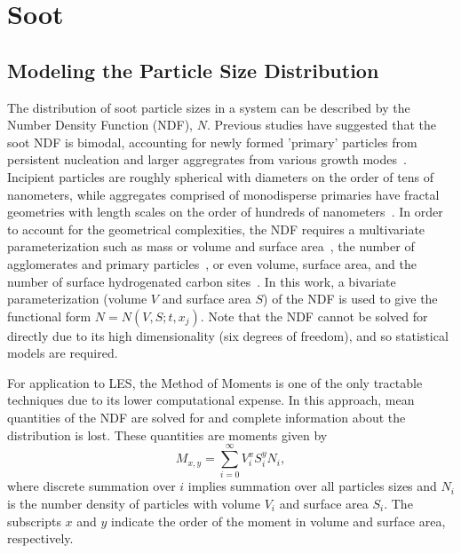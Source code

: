 \section{Soot}
\label{sec:lesmodels:soot}

\subsection{Modeling the Particle Size Distribution}
\label{sec:lesmodels:soot:ndf}

The distribution of soot particle sizes in a system can be described by the Number Density Function (NDF), $N$. Previous studies have suggested that the soot NDF is bimodal, accounting for newly formed 'primary' particles from persistent nucleation and larger aggregrates from various growth modes~\cite{zhao2003,zhao2005,netzell2007}. Incipient particles are roughly spherical with diameters on the order of tens of nanometers, while aggregates comprised of monodisperse primaries have fractal geometries with length scales on the order of hundreds of nanometers~\cite{vanderwal1999}. In order to account for the geometrical complexities, the NDF requires a multivariate parameterization such as mass or volume and surface area~\cite{patterson2007,mueller2009,hmom2009}, the number of agglomerates and primary particles~\cite{park2004}, or even volume, surface area, and the number of surface hydrogenated carbon sites~\cite{blanquart2009}. In this work, a bivariate parameterization (volume $V$ and surface area $S$) of the NDF is used to give the functional form $N = N(V, S; t, x_j)$. Note that the NDF cannot be solved for directly due to its high dimensionality (six degrees of freedom), and so statistical models are required.

For application to LES, the Method of Moments is one of the only tractable techniques due to its lower computational expense. In this approach, mean quantities of the NDF are solved for and complete information about the distribution is lost. These quantities are moments given by
\begin{equation}\label{eq:lesmodels:soot:ndf:moments}
  M_{x,y} = \sum\limits_{i=0}^\infty V_i^x S_i^y N_i,
\end{equation}
where discrete summation over $i$ implies summation over all particles sizes and $N_i$ is the number density of particles with volume $V_i$ and surface area $S_i$. The subscripts $x$ and $y$ indicate the order of the moment in volume and surface area, respectively.

